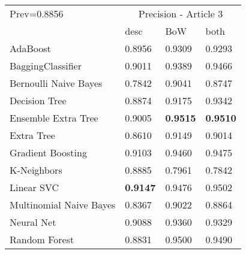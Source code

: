 \begin{tabular}{|l|l|l|l| }
\hline
Prev=0.8856 &  \multicolumn{3}{c|}{Precision - Article 3} \\
\cline{2-4} & desc & BoW & both \\ \hline
AdaBoost                & 0.8956 & 0.9309 & 0.9293\\
BaggingClassifier       & 0.9011 & 0.9389 & 0.9466\\
Bernoulli Naive Bayes   & 0.7842 & 0.9041 & 0.8747\\
Decision Tree           & 0.8874 & 0.9175 & 0.9342\\
Ensemble Extra Tree     & 0.9005 & {\bf 0.9515} & {\bf 0.9510}\\
Extra Tree              & 0.8610 & 0.9149 & 0.9014\\
Gradient Boosting       & 0.9103 & 0.9460 & 0.9475\\
K-Neighbors             & 0.8885 & 0.7961 & 0.7842\\
Linear SVC              & {\bf 0.9147} & 0.9476 & 0.9502\\
Multinomial Naive Bayes & 0.8367 & 0.9022 & 0.8864\\
Neural Net              & 0.9088 & 0.9360 & 0.9329\\
Random Forest           & 0.8831 & 0.9500 & 0.9490\\
\hline
\end{tabular}